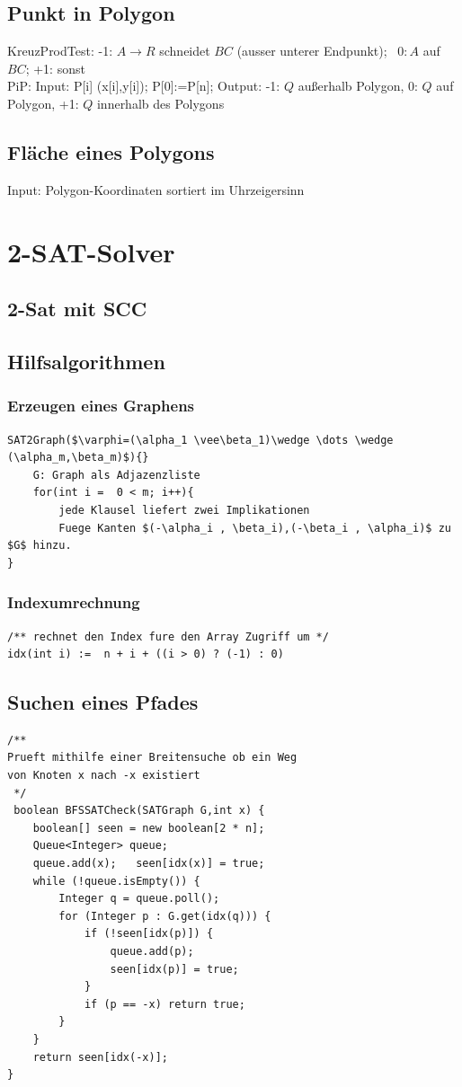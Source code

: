 \documentclass[10pt,a4paper,ngerman,oneside,]{article}
\begin{document}
\begin{multicols}{2}
\subsection{Punkt in Polygon}
 KreuzProdTest: -1: $A\to R$ schneidet $BC$ (ausser unterer Endpunkt);~ $0: A$ auf $BC$;  +1: sonst\\
 PiP: Input: P[i] (x[i],y[i]); P[0]:=P[n]; Output: -1: $Q$ außerhalb Polygon, 0: $Q$ auf Polygon, +1: $Q$ innerhalb des Polygons
\subsection{Fläche eines Polygons}
Input: Polygon-Koordinaten sortiert im Uhrzeigersinn
\section{2-SAT-Solver}
\subsection{2-Sat mit SCC}

\subsection{Hilfsalgorithmen}
\subsubsection{Erzeugen eines Graphens}
\begin{lstlisting}[]
SAT2Graph($\varphi=(\alpha_1 \vee\beta_1)\wedge \dots \wedge (\alpha_m,\beta_m)$){}
	G: Graph als Adjazenzliste
	for(int i =  0 < m; i++){
		jede Klausel liefert zwei Implikationen 
		Fuege Kanten $(-\alpha_i , \beta_i),(-\beta_i , \alpha_i)$ zu $G$ hinzu.
}
\end{lstlisting}
\subsubsection{Indexumrechnung}
\begin{lstlisting}
/** rechnet den Index fure den Array Zugriff um */
idx(int i) :=  n + i + ((i > 0) ? (-1) : 0)
\end{lstlisting}
\subsection{Suchen eines Pfades}
\begin{lstlisting}
/** 
Prueft mithilfe einer Breitensuche ob ein Weg 
von Knoten x nach -x existiert
 */
 boolean BFSSATCheck(SATGraph G,int x) {
	boolean[] seen = new boolean[2 * n];
	Queue<Integer> queue;
	queue.add(x);	seen[idx(x)] = true;
	while (!queue.isEmpty()) {
		Integer q = queue.poll();
		for (Integer p : G.get(idx(q))) {
			if (!seen[idx(p)]) {
				queue.add(p);
				seen[idx(p)] = true;
			}
			if (p == -x) return true;
		}
	}
	return seen[idx(-x)];
}
\end{lstlisting}


\end{multicols}
\end{document}
